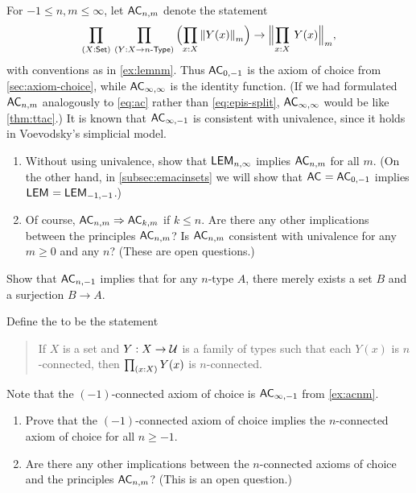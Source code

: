 \begin{ex}\label{ex:acnm}
  For $-1\le n,m\le\infty$, let $\mathsf{AC}_{n,m}$ denote the statement
  \[ \prd{X:\set}{Y:X\to\ntype{n}}
  \Parens{\prd{x:X} \trunc m{Y(x)}}
  \to
  \Trunc m{\prd{x:X} Y(x)},
  \]
  with conventions as in \cref{ex:lemnm}.
  Thus $\mathsf{AC}_{0,-1}$ is the axiom of choice from \cref{sec:axiom-choice},
  while $\mathsf{AC}_{\infty,\infty}$ is the identity function.
  (If we had formulated $\mathsf{AC}_{n,m}$ analogously to \eqref{eq:ac}
  rather than \eqref{eq:epis-split},
  $\mathsf{AC}_{\infty,\infty}$ would be like \cref{thm:ttac}.)
  It is known that $\mathsf{AC}_{\infty,-1}$ is consistent with univalence, since it holds in Voevodsky's simplicial model.
  \begin{enumerate}
  \item Without using univalence, show that $\mathsf{LEM}_{n,\infty}$ implies $\mathsf{AC}_{n,m}$ for all $m$.
    (On the other hand, in \cref{subsec:emacinsets} we will show that $\mathsf{AC}_{}=\mathsf{AC}_{0,-1}$ implies $\mathsf{LEM}_{}=\mathsf{LEM}_{-1,-1}$.)
  \item Of course, $\mathsf{AC}_{n,m}\Rightarrow \mathsf{AC}_{k,m}$ if $k\le n$.
    Are there any other implications between the principles $\mathsf{AC}_{n,m}$?
    Is $\mathsf{AC}_{n,m}$ consistent with univalence for any $m\ge 0$ and any $n$?
    (These are open questions.)
  \end{enumerate}
\end{ex}

\begin{ex}\label{ex:acnm-surjset}
  Show that $\mathsf{AC}_{n,-1}$ implies that for any $n$-type $A$, there merely exists a set $B$ and a surjection $B\to A$.
\end{ex}

\begin{ex}\label{ex:acconn}
  Define the 
  to be the statement
  \begin{quote}
    If $X$ is a set and $Y:X\to \mathcal{U}$ is a family of types such that each $Y(x)$ is $n$-connected, then $\prd{x:X} Y(x)$ is $n$-connected.
  \end{quote}
  Note that the $(-1)$-connected axiom of choice is $\mathsf{AC}_{\infty,-1}$ from \cref{ex:acnm}.
  \begin{enumerate}
  \item Prove that the $(-1)$-connected axiom of choice implies the $n$-con\-nect\-ed axiom of choice for all $n\ge -1$.
  \item Are there any other implications between the $n$-connected axioms of choice and the principles $\mathsf{AC}_{n,m}$?
    (This is an open question.)
  \end{enumerate}
\end{ex}

